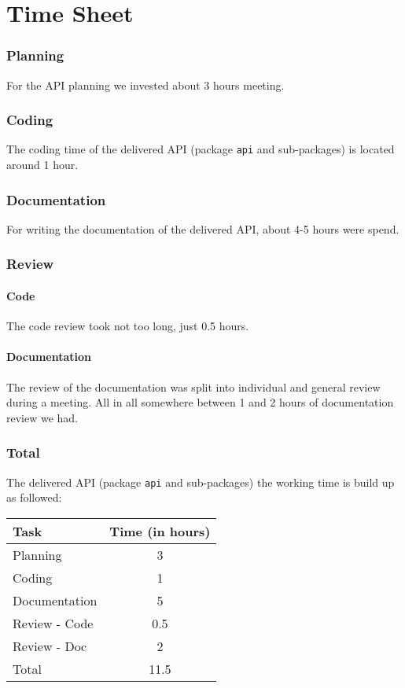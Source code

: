 \documentclass{article} %
\begin{document}
\part{Time Sheet}
\section{Planning}
For the API planning we invested about 3 hours meeting.
\section{Coding}
The coding time of the delivered API (package \texttt{api} and sub-packages) is located around 1 hour.
\section{Documentation}
For writing the documentation of the delivered API, about 4-5 hours were spend.
\section{Review}
\subsection{Code}
The code review took not too long, just 0.5 hours.
\subsection{Documentation}
The review of the documentation was split into individual and general review during a meeting. All in all somewhere between 1 and 2 hours of documentation review we had.
\section{Total}
The delivered API (package \texttt{api} and sub-packages) the working time is build up as followed:
\begin{center}
	\begin{tabular}{|l|c|}
	\hline  Task & Time (in hours) \\ 
	\hline  Planning &  3\\ 
	\hline  Coding &  1\\ 
	\hline  Documentation & 5 \\ 
	\hline  Review - Code&  0.5\\ 
	\hline  Review - Doc &  2\\ 
	\hline\hline   Total &  11.5\\ 
	\hline 
\end{tabular} 
\end{center}
\end{document}
